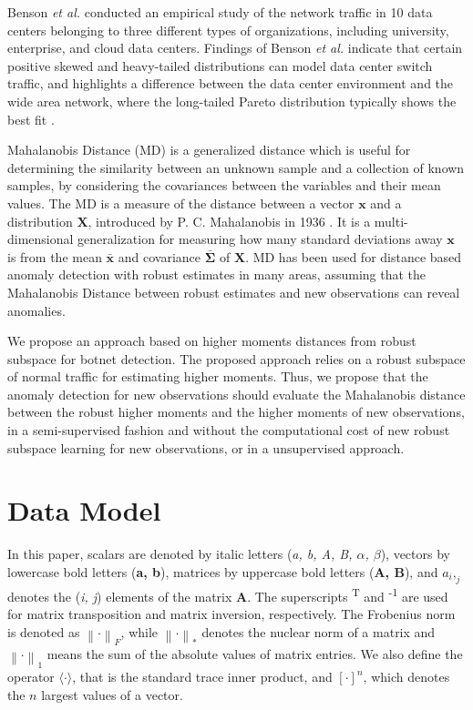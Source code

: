 Benson \emph{et al.} \cite{benson2010network} conducted an empirical study of the network traffic in 10 data centers belonging to three different types of organizations, including university, enterprise, and cloud data centers. Findings of Benson \emph{et al.} indicate that certain positive skewed and heavy-tailed distributions can model data center switch traffic, and highlights a difference between the data center environment and the wide area network, where the long-tailed Pareto distribution typically shows the best fit \cite{benson2010network}.

Mahalanobis Distance (MD) is a generalized distance which is useful for determining the similarity between an unknown sample and a collection of known samples, by considering the covariances between the variables and their mean values. The MD is a measure of the distance between a vector $\boldsymbol{x}$ and a distribution $\boldsymbol{X}$, introduced by P. C. Mahalanobis in 1936 \cite{mahalanobis1936md}. It is a multi-dimensional generalization for measuring how many standard deviations away $\boldsymbol{x}$ is from the mean $\boldsymbol{\bar{x}}$ and covariance $\boldsymbol{\bar{\Sigma}}$ of $\boldsymbol{X}$. MD has been used for distance based anomaly detection with robust estimates in many areas, assuming that the Mahalanobis Distance between robust estimates and new observations can reveal anomalies.

We propose an approach based on higher moments distances from robust subspace for botnet detection. The proposed approach relies on a robust subspace of normal traffic for estimating higher moments. Thus, we propose that the anomaly detection for new observations should evaluate the Mahalanobis distance between the robust higher moments and the higher moments of new observations, in a semi-supervised fashion and without the computational cost of new robust subspace learning for new observations, or in a unsupervised approach. 


\section{Data Model}
\label{sec:4_datamodel}

In this paper, scalars are denoted by italic letters (\emph{a, b, A, B, $\alpha$, $\beta$}), vectors by lowercase bold letters (\textbf{a, b}), matrices by uppercase bold letters (\textbf{A, B}), and $a_i,_j$ denotes the (\emph{i, j}) elements of the matrix \textbf{A}. The superscripts \textsuperscript{T} and \textsuperscript{-1} are used for matrix transposition and matrix inversion, respectively. The Frobenius norm is denoted as $\left\| \mathord{\cdot} \right\|_F$, while $\left\| \mathord{\cdot} \right\|_*$ denotes the nuclear norm of a matrix and $\left\| \mathord{\cdot} \right\|_1$ means the sum of the absolute values of matrix entries. We also define the operator $\langle \mathord{\cdot} \rangle$, that is the standard trace inner product, and $[ \mathord{\cdot} ]^n$, which denotes the $n$ largest values of a vector.


